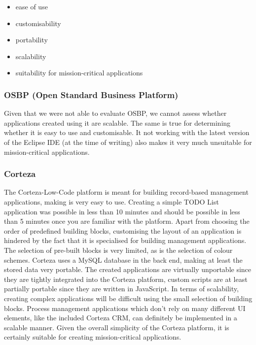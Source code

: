 \documentclass[runningheads]{llncs}
\begin{document}

\begin{itemize}
  \item ease of use
  \item customisability
  \item portability
  \item scalability
  \item suitability for mission-critical applications
\end{itemize}

\subsubsection{OSBP (Open Standard Business Platform)}

Given that we were not able to evaluate OSBP, we cannot assess whether applications created using it are scalable. The same is true for determining whether it is easy to use and customisable. It not working with the latest version of the Eclipse IDE (at the time of writing) also makes it very much unsuitable for mission-critical applications.

\subsubsection{Corteza}

The Corteza-Low-Code platform is meant for building record-based management applications, making is very easy to use. Creating a simple TODO List application was possible in less than 10 minutes and should be possible in less than 5 minutes once you are familiar with the platform. Apart from choosing the order of predefined building blocks, customising the layout of an application is hindered by the fact that it is specialised for building management applications. The selection of pre-built blocks is very limited, as is the selection of colour schemes. Corteza uses a MySQL database in the back end, making at least the stored data very portable. The created applications are virtually unportable since they are tightly integrated into the Corteza platform, custom scripts are at least partially portable since they are written in JavaScript. In terms of scalability, creating complex applications will be difficult using the small selection of building blocks. Process management applications which don't rely on many different UI elements, like the included Corteza CRM, can definitely be implemented in a scalable manner. Given the overall simplicity of the Corteza platform, it is certainly suitable for creating mission-critical applications.
\end{document}
